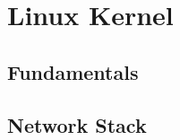 
\section{Linux Kernel} %
\label{sec:Linux Kernel}

\subsection{Fundamentals} %
\label{sub:Fundamentals}


\subsection{Network Stack} %
\label{sub:Network Stack}


